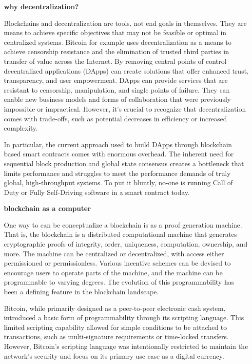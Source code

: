 \documentclass{article}
\begin{document}
\textbf{why decentralization?}
\vspace{2mm}

Blockchains and decentralization are tools, not end goals in themselves. They are means to achieve specific objectives that may not be feasible or optimal in centralized systems. Bitcoin for example uses decentralization as a means to achieve censorship resistance and the elimination of trusted third parties in transfer of value across the Internet. By removing central points of control decentralized applications (DApps) can create solutions that offer enhanced trust, transparency, and user empowerment. DApps can provide services that are resistant to censorship, manipulation, and single points of failure. They can enable new business models and forms of collaboration that were previously impossible or impractical. However, it's crucial to recognize that decentralization comes with trade-offs, such as potential decreases in efficiency or increased complexity.
\vspace{2mm}

In particular, the current approach used to build DApps through blockchain based smart contracts comes with enormous overhead. The inherent need for sequential block production and global state consensus creates a bottleneck that limits performance and struggles to meet the performance demands of truly global, high-throughput systems. To put it bluntly, no-one is running Call of Duty or Fully Self-Driving software in a smart contract today.

\vspace{2mm}
\textbf{blockchain as a computer}
\vspace{2mm}

One way to  can be conceptualize a blockchain is as a proof generation machine. That is, the blockchain is a distributed computational machine that generates cryptographic proofs of  integrity, order, uniqueness, computation, ownership, and more. The machine can be centralized or decentralized, with access either permissioned or permissionless. Various incentive schemes can be devised to encourage users to operate parts of the machine, and the machine can be programmable to varying degrees. The evolution of this programmability has been a defining feature in the blockchain landscape.
\vspace{2mm}

Bitcoin, while primarily designed as a peer-to-peer electronic cash system, introduced a basic form of programmability through its scripting language. This limited scripting capability allowed for simple conditions to be attached to transactions, such as multi-signature requirements or time-locked transfers. However, Bitcoin's scripting language was intentionally restricted to maintain the network's security and focus on its primary use case as a digital currency.
\end{document}
